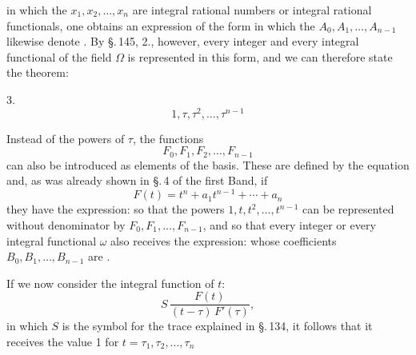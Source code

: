 
in which the $x_1, x_2, \ldots, x_n$ are integral rational numbers or integral rational functionals, one obtains an expression of the form
in which the $A_0, A_1, \ldots, A_{n-1}$ likewise denote . By \S.\,145, 2., however, every integer and every integral functional of the field $\Omega$ is represented in this form, and we can therefore state the theorem:

3. 
\[
1, \tau, \tau^2, \ldots, \tau^{n-1}
\]

Instead of the powers of $\tau$, the functions
\[
F_0, F_1, F_2, \ldots, F_{n-1}
\]
can also be introduced as elements of the basis. These are defined by the equation
and, as was already shown in \S.\,4 of the first Band, if
\[
F(t) = t^n + a_1t^{n-1} + \cdots + a_n
\]
they have the expression:
so that the powers $1, t, t^2, \ldots, t^{n-1}$ can be represented without denominator by $F_0, F_1, \ldots, F_{n-1}$, and so that every integer or every integral functional $\omega$ also receives the expression:
whose coefficients $B_0, B_1, \ldots, B_{n-1}$ are .

If we now consider the integral function of $t$:
\[
S\,\frac{F(t)}{(t-\tau)\,F'(\tau)},
\]
in which $S$ is the symbol for the trace explained in \S.\,134, it follows that it receives the value 1 for $t=\tau_1,\tau_2,\ldots,\tau_n$
